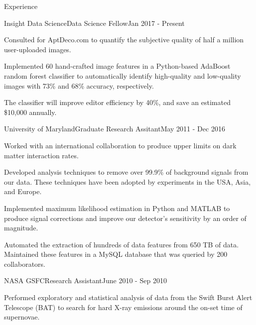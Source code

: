 \documentclass{resume} %
\begin{document}
\begin{rSection}{Experience}

\begin{rSubsection}{Insight Data Science}{Data Science Fellow}{Jan 2017 - Present}{}{ }
\item Consulted for AptDeco.com to quantify the subjective quality of half a million user-uploaded images.
\item Implemented 60 hand-crafted image features in a Python-based AdaBoost random forest classifier to automatically identify high-quality and low-quality images with 73\%  and 68\% accuracy, respectively.
\item The classifier will improve editor efficiency by 40\%, and save an estimated \$10,000 annually.
\end{rSubsection}


\begin{rSubsection}{University of Maryland}{Graduate Research Assitant}{May 2011 - Dec 2016}{}{ }

\item Worked with an international collaboration to produce upper limits on dark matter interaction rates.
\item Developed analysis techniques to remove over 99.9\% of background signals from our data. These techniques have been adopted by experiments in the USA, Asia, and Europe.
\item Implemented maximum likelihood estimation in Python and MATLAB to produce signal corrections and improve our detector's sensitivity by an order of magnitude.
\item Automated the extraction of hundreds of data features from 650 TB of data.  Maintained these features in a MySQL database that was queried by 200 collaborators.


\end{rSubsection}


\begin{rSubsection}{NASA GSFC}{Research Assistant}{June 2010 - Sep 2010}{}{}
\item Performed exploratory and statistical analysis of data from the Swift Burst Alert Telescope (BAT) to search for hard X-ray emissions around the on-set time of supernovae.
\end{rSubsection}

\end{rSection}
\end{document}
